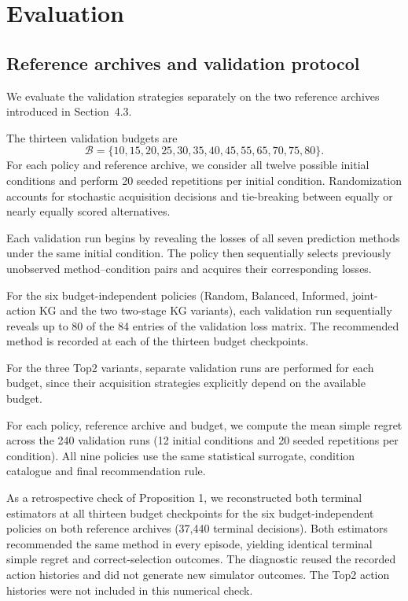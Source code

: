 \documentclass[10pt,a4paper]{article}
\newif\ifrevisionmarked
\newcommand{\revadd}[1]{\ifrevisionmarked\hl{#1}\else#1\fi}
\begin{document}
\section{Evaluation}
\subsection{Reference archives and validation protocol}
\label{sec:validation-protocol}
We evaluate the validation strategies separately on
the two reference archives introduced in Section~4.3.

The thirteen validation budgets are
\[
\mathcal B=\{10,15,20,25,30,35,40,45,55,65,70,75,80\}.
\]
For each policy and reference archive, we consider
all twelve possible initial conditions and perform
20 seeded repetitions per initial condition.
Randomization accounts for stochastic acquisition
decisions and tie-breaking between equally or nearly
equally scored alternatives.

Each validation run begins by revealing the losses of
all seven prediction methods under the same initial
condition. The policy then sequentially selects
previously unobserved method--condition pairs and
acquires their corresponding losses.

For the six budget-independent policies (Random,
Balanced, Informed, joint-action KG and the two
two-stage KG variants), each validation run
sequentially reveals up to 80 of the 84 entries
of the validation loss matrix. The recommended
method is recorded at each of the thirteen
budget checkpoints.

For the three Top2 variants, separate validation runs
are performed for each budget, since their acquisition
strategies explicitly depend on the available budget.

For each policy, reference archive and budget,
we compute the mean simple regret across the
240 validation runs (12 initial conditions
and 20 seeded repetitions per condition). All nine policies use
the same statistical surrogate, condition catalogue
and final recommendation rule.

\revadd{As a retrospective check of Proposition 1, we reconstructed both terminal estimators at all thirteen budget checkpoints for the six budget-independent policies on both reference archives (37,440 terminal decisions). Both estimators recommended the same method in every episode, yielding identical terminal simple regret and correct-selection outcomes. The diagnostic reused the recorded action histories and did not generate new simulator outcomes. The Top2 action histories were not included in this numerical check.}
\end{document}

